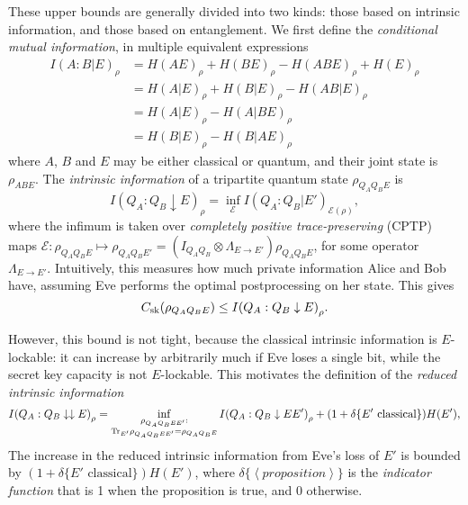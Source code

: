 \documentclass[10pt, a4paper]{article}
\numberwithin{equation}{section} %
\theoremstyle{definition}
\theoremstyle{plain}
\newcommand{\?}{\mathrel{?}} %
\newcommand{\angleb}[1]{\left\langle #1 \right\rangle} %
\newcommand{\Tr}{\mathrm{Tr}} %
\newcommand{\cE}{\mathcal{E}}
\newcommand{\sk}{\rm sk}
\begin{document}
      These upper bounds are generally divided into two kinds: those based on intrinsic information, and those based on entanglement. We first define the \emph{conditional mutual information}, in multiple equivalent expressions
      \begin{align}
        I{(A:B|E)}_{\rho} &= H{(AE)}_{\rho} + H{(BE)}_{\rho} - H{(ABE)}_{\rho} + H{(E)}_{\rho} \\
                          &= H{(A|E)}_{\rho} + H{(B|E)}_{\rho} - H{(AB|E)}_{\rho} \\
                          &= H{(A|E)}_{\rho} - H{(A|BE)}_{\rho} \\
                          &= H{(B|E)}_{\rho} - H{(B|AE)}_{\rho}
      \end{align}
      where \(A\), \(B\) and \(E\) may be either classical or quantum, and their joint state is \(\rho_{ABE}\). The \emph{intrinsic information} of a tripartite quantum state \(\rho_{Q_A Q_B E}\) is
      \begin{equation}
        I{(Q_A : Q_B \downarrow E)}_{\rho} = \inf_{\cE} I{(Q_A : Q_B|E')}_{\cE(\rho)},
      \end{equation}
      where the infimum is taken over \emph{completely positive trace-preserving} (CPTP) maps \(\cE : \rho_{Q_A Q_B E} \mapsto \rho_{Q_A Q_B E'} = \left(I_{Q_A Q_B} \otimes \Lambda_{E \to E'}\right) \rho_{Q_A Q_B E}\), for some operator \(\Lambda_{E \to E'}\). Intuitively, this measures how much private information Alice and Bob have, assuming Eve performs the optimal postprocessing on her state. This gives
      \begin{equation}
        C_{\sk}(\rho_{Q_A Q_B E}) \leq I{(Q_A : Q_B \downarrow E)}_{\rho}.
      \end{equation}

      However, this bound is not tight, because the classical intrinsic information is \(E\)-lockable: it can increase by arbitrarily much if Eve loses a single bit, while the secret key capacity is not \(E\)-lockable. This motivates the definition of the \emph{reduced intrinsic information}
      \begin{equation}
        I{(Q_A : Q_B \downarrow\downarrow E)}_{\rho} = \inf_{%
        \substack{\rho_{Q_A Q_B EE'} : \\ 
        \Tr_{E'} \rho_{Q_A Q_B EE'} = \rho_{Q_A Q_B E}}}
        I{(Q_A : Q_B \downarrow EE')}_{\rho} + (1+\delta\{E' \text{ classical}\})H(E'),
      \end{equation}
      The increase in the reduced intrinsic information from Eve's loss of \(E'\) is bounded by \((1+\delta\{E' \text{ classical}\})H(E')\), where \(\delta\{\angleb{proposition}\}\) is the \emph{indicator function} that is 1 when the proposition is true, and 0 otherwise.
\end{document}
